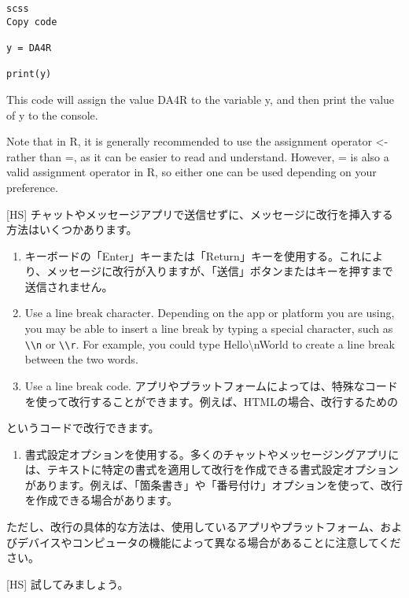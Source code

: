 \documentclass[
]{book}
\providecommand{\tightlist}{%
  \setlength{\itemsep}{0pt}\setlength{\parskip}{0pt}}
\theoremstyle{definition}
\theoremstyle{definition}
\theoremstyle{definition}
\theoremstyle{definition}
\theoremstyle{remark}
\begin{document}
\begin{verbatim}
scss
Copy code

y = DA4R

print(y)
\end{verbatim}

This code will assign the value DA4R to the variable y, and then print the value of y to the console.

Note that in R, it is generally recommended to use the assignment operator \textless- rather than =, as it can be easier to read and understand. However, = is also a valid assignment operator in R, so either one can be used depending on your preference.

{[}HS{]} チャットやメッセージアプリで送信せずに、メッセージに改行を挿入する方法はいくつかあります。

\begin{enumerate}
\def\labelenumi{\arabic{enumi}.}
\item
  キーボードの「Enter」キーまたは「Return」キーを使用する。これにより、メッセージに改行が入りますが、「送信」ボタンまたはキーを押すまで送信されません。
\item
  Use a line break character. Depending on the app or platform you are using, you may be able to insert a line break by typing a special character, such as \texttt{\textbackslash{}\textbackslash{}n} or \texttt{\textbackslash{}\textbackslash{}r}. For example, you could type Hello\textbackslash nWorld to create a line break between the two words.
\item
  Use a line break code. アプリやプラットフォームによっては、特殊なコードを使って改行することができます。例えば、HTMLの場合、改行するための
\end{enumerate}

というコードで改行できます。

\begin{enumerate}
\def\labelenumi{\arabic{enumi}.}
\setcounter{enumi}{3}
\tightlist
\item
  書式設定オプションを使用する。多くのチャットやメッセージングアプリには、テキストに特定の書式を適用して改行を作成できる書式設定オプションがあります。例えば、「箇条書き」や「番号付け」オプションを使って、改行を作成できる場合があります。
\end{enumerate}

ただし、改行の具体的な方法は、使用しているアプリやプラットフォーム、およびデバイスやコンピュータの機能によって異なる場合があることに注意してください。

{[}HS{]} 試してみましょう。
\end{document}
